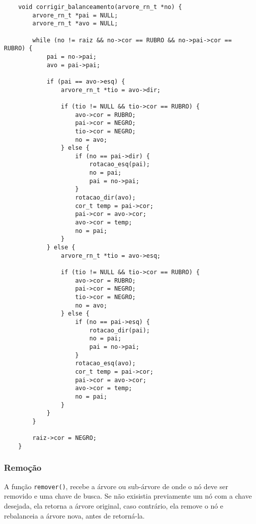 \begin{lstlisting}
    void corrigir_balanceamento(arvore_rn_t *no) {
        arvore_rn_t *pai = NULL;
        arvore_rn_t *avo = NULL;

        while (no != raiz && no->cor == RUBRO && no->pai->cor == RUBRO) {
            pai = no->pai;
            avo = pai->pai;

            if (pai == avo->esq) {
                arvore_rn_t *tio = avo->dir;

                if (tio != NULL && tio->cor == RUBRO) {
                    avo->cor = RUBRO;
                    pai->cor = NEGRO;
                    tio->cor = NEGRO;
                    no = avo;
                } else {
                    if (no == pai->dir) {
                        rotacao_esq(pai);
                        no = pai;
                        pai = no->pai;
                    }
                    rotacao_dir(avo);
                    cor_t temp = pai->cor;
                    pai->cor = avo->cor;
                    avo->cor = temp;
                    no = pai;
                }
            } else {
                arvore_rn_t *tio = avo->esq;

                if (tio != NULL && tio->cor == RUBRO) {
                    avo->cor = RUBRO;
                    pai->cor = NEGRO;
                    tio->cor = NEGRO;
                    no = avo;
                } else {
                    if (no == pai->esq) {
                        rotacao_dir(pai);
                        no = pai;
                        pai = no->pai;
                    }
                    rotacao_esq(avo);
                    cor_t temp = pai->cor;
                    pai->cor = avo->cor;
                    avo->cor = temp;
                    no = pai;
                }
            }
        }

        raiz->cor = NEGRO;
    }
\end{lstlisting}

\vspace{3mm}

\subsubsection{Remoção}

A função \texttt{remover()}, recebe a árvore ou sub-árvore de onde o nó deve ser removido e uma chave de busca. Se não exisistia previamente um nó com a chave desejada, ela retorna a árvore original, caso contrário, ela remove o nó e rebalanceia a árvore nova, antes de retorná-la.

